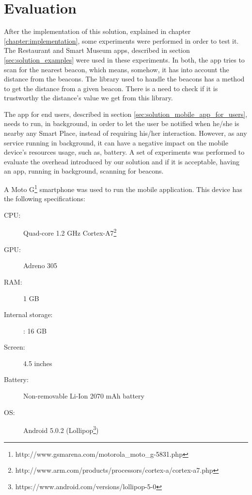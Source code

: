 
\chapter{Evaluation}
\label{chapter:evaluation}

After the implementation of this solution, explained in chapter \ref{chapter:implementation}, some experiments were performed in order to test it.
The Restaurant and Smart Museum apps, described in section \ref{sec:solution_examples} were used in these experiments. In both, the app tries to scan for the nearest beacon, which means, somehow, it has into account the distance from the beacons.
The library used to handle the beacons has a method to get the distance from a given beacon.
There is a need to check if it is trustworthy the distance's value we get from this library.

The app for end users, described in section \ref{sec:solution_mobile_app_for_users}, needs to run, in background, in order to let the user be notified when he/she is nearby any Smart Place, instead of requiring his/her interaction.
However, as any service running in background, it can have a negative impact on the mobile device's resources usage, such as, battery.
A set of experiments was performed to evaluate the overhead introduced by our solution and if it is acceptable, having an app, running in background, scanning for beacons.

A 
Moto G\footnote{http://www.gsmarena.com/motorola\_moto\_g-5831.php} smartphone was used to run the mobile application. This device has the following specifications:
\begin{description}
  \item[\gls{CPU}:] Quad-core 1.2 GHz Cortex-A7\footnote{http://www.arm.com/products/processors/cortex-a/cortex-a7.php}
  \item[\gls{GPU}:] Adreno 305
  \item[\gls{RAM}:] 1 \gls{GB}
  \item[Internal storage:]: 16 \gls{GB}
  \item[Screen:] 4.5 inches
  \item[Battery:] Non-removable Li-Ion 2070 \gls{mAh} battery
  \item[\gls{OS}:] Android 5.0.2 (Lollipop\footnote{https://www.android.com/versions/lollipop-5-0})
\end{description}

